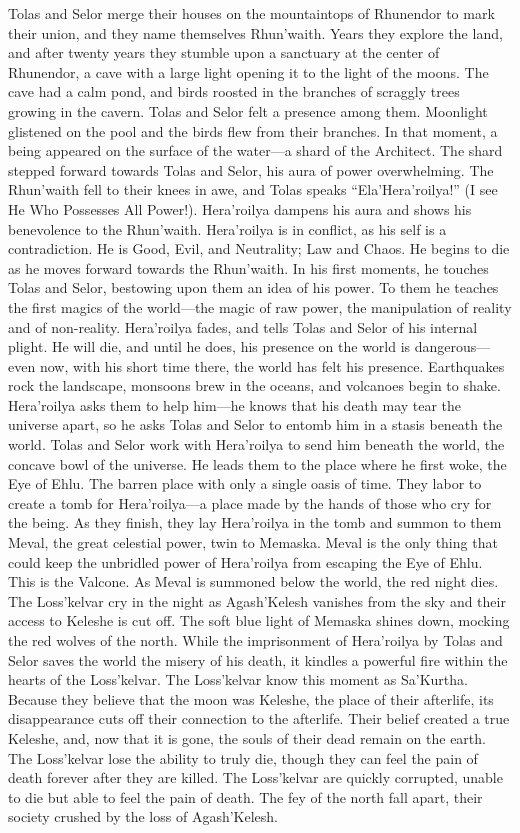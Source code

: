 \documentclass[smalldemyvopaper,11pt,twoside,onecolumn,openright,extrafontsizes]{memoir}
\begin{document}
Tolas and Selor merge their houses on the mountaintops of Rhunendor to mark their union, and they name themselves Rhun’waith. Years they explore the land, and after twenty years they stumble upon a sanctuary at the center of Rhunendor, a cave with a large light opening it to the light of the moons. The cave had a calm pond, and birds roosted in the branches of scraggly trees growing in the cavern. Tolas and Selor felt a presence among them. Moonlight glistened on the pool and the birds flew from their branches. In that moment, a being appeared on the surface of the water—a shard of the Architect. The shard stepped forward towards Tolas and Selor, his aura of power overwhelming. The Rhun’waith fell to their knees in awe, and Tolas speaks “Ela’Hera’roilya!” (I see He Who Possesses All Power!). Hera’roilya dampens his aura and shows his benevolence to the Rhun’waith.
Hera’roilya is in conflict, as his self is a contradiction. He is Good, Evil, and Neutrality; Law and Chaos. He begins to die as he moves forward towards the Rhun’waith. In his first moments, he touches Tolas and Selor, bestowing upon them an idea of his power. To them he teaches the first magics of the world—the magic of raw power, the manipulation of reality and of non-reality. Hera’roilya fades, and tells Tolas and Selor of his internal plight. He will die, and until he does, his presence on the world is dangerous—even now, with his short time there, the world has felt his presence. Earthquakes rock the landscape, monsoons brew in the oceans, and volcanoes begin to shake.
Hera’roilya asks them to help him—he knows that his death may tear the universe apart, so he asks Tolas and Selor to entomb him in a stasis beneath the world. Tolas and Selor work with Hera’roilya to send him beneath the world, the concave bowl of the universe. He leads them to the place where he first woke, the Eye of Ehlu. The barren place with only a single oasis of time. They labor to create a tomb for Hera’roilya—a place made by the hands of those who cry for the being. As they finish, they lay Hera’roilya in the tomb and summon to them Meval, the great celestial power, twin to Memaska. Meval is the only thing that could keep the unbridled power of Hera’roilya from escaping the Eye of Ehlu. This is the Valcone. As Meval is summoned below the world, the red night dies. The Loss’kelvar cry in the night as Agash’Kelesh vanishes from the sky and their access to Keleshe is cut off. The soft blue light of Memaska shines down, mocking the red wolves of the north. While the imprisonment of Hera’roilya by Tolas and Selor saves the world the misery of his death, it kindles a powerful fire within the hearts of the Loss’kelvar. The Loss’kelvar know this moment as Sa’Kurtha. Because they believe that the moon was Keleshe, the place of their afterlife, its disappearance cuts off their connection to the afterlife. Their belief created a true Keleshe, and, now that it is gone, the souls of their dead remain on the earth. The Loss’kelvar lose the ability to truly die, though they can feel the pain of death forever after they are killed. The Loss’kelvar are quickly corrupted, unable to die but able to feel the pain of death. The fey of the north fall apart, their society crushed by the loss of Agash’Kelesh.
\end{document}
